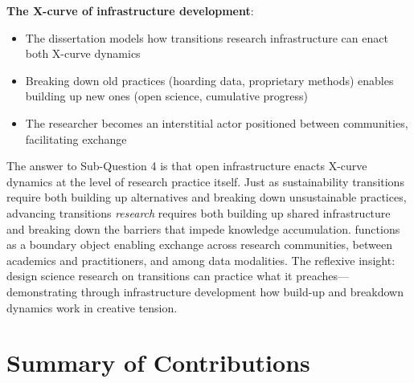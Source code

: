 \documentclass[../main.tex]{subfiles}
\begin{document}
\textbf{The X-curve of infrastructure development}:
\begin{itemize}[leftmargin=*, itemsep=0.2em]
\item The dissertation models how transitions research infrastructure can enact both X-curve dynamics
\item Breaking down old practices (hoarding data, proprietary methods) enables building up new ones (open science, cumulative progress)
\item The researcher becomes an interstitial actor positioned between communities, facilitating exchange
\end{itemize}

The answer to Sub-Question 4 is that open infrastructure enacts X-curve dynamics at the level of research practice itself. Just as sustainability transitions require both building up alternatives and breaking down unsustainable practices, advancing transitions \emph{research} requires both building up shared infrastructure and breaking down the barriers that impede knowledge accumulation. \RoleBox{} functions as a boundary object enabling exchange across research communities, between academics and practitioners, and among data modalities. The reflexive insight: design science research on transitions can practice what it preaches---demonstrating through infrastructure development how build-up and breakdown dynamics work in creative tension.


\section{Summary of Contributions}
\end{document}
